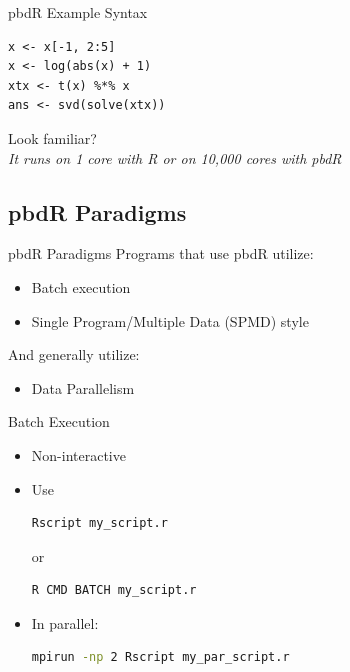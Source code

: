 \begin{frame}[fragile]
  \begin{block}{pbdR Example Syntax}
  \begin{lstlisting}
x <- x[-1, 2:5]
x <- log(abs(x) + 1)
xtx <- t(x) %*% x
ans <- svd(solve(xtx))
  \end{lstlisting}
  \begin{center}
  Look familiar?\\[.4cm]
  \emph{It runs on 1 core with R or on 10,000 cores with pbdR}

  \end{center}
  \end{block}
\end{frame}

\subsection{pbdR Paradigms}

\begin{frame}
  \begin{block}{pbdR Paradigms}
  Programs that use pbdR utilize:
  \begin{itemize}[<+-|alert@+>]
   \item Batch execution
   \item Single Program/Multiple Data (SPMD) style
   \\[.2cm]
   \end{itemize}
    And generally utilize:
   \begin{itemize}
   \item Data Parallelism
  \end{itemize}
  \end{block}
\end{frame}


\begin{frame}[fragile]
  \begin{block}{Batch Execution}\pause
    \begin{itemize}
      \item Non-interactive
      \item Use
\vspace{-.4cm}
\begin{lstlisting}[language=sh]
Rscript my_script.r
\end{lstlisting}
or\vspace{-.4cm}
\begin{lstlisting}[language=sh]
R CMD BATCH my_script.r
\end{lstlisting}
      \item In parallel:
\vspace{-.4cm}
\begin{lstlisting}[language=sh]
mpirun -np 2 Rscript my_par_script.r
\end{lstlisting}
    \end{itemize}
  \end{block}
\end{frame}

